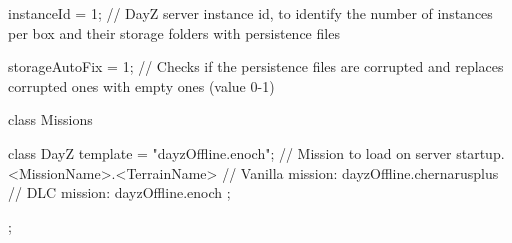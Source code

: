 instanceId = 1;				// DayZ server instance id, to identify the number of instances per box and their storage folders with persistence files

storageAutoFix = 1;			// Checks if the persistence files are corrupted and replaces corrupted ones with empty ones (value 0-1)


class Missions
{
	class DayZ
	{
		template = "dayzOffline.enoch"; // Mission to load on server startup. <MissionName>.<TerrainName>
		                                        // Vanilla mission: dayzOffline.chernarusplus
					                            // DLC mission: dayzOffline.enoch
	};

};
